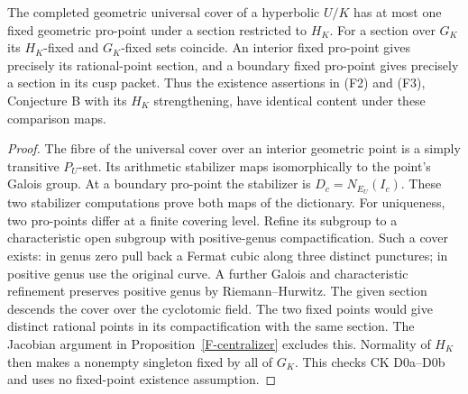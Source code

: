 \begin{proposition}
\label{F-fixed-dictionary}
The completed geometric universal cover of a hyperbolic $U/K$
has at most one fixed geometric pro-point under a section restricted
to $H_K$. For a section over $G_K$ its $H_K$-fixed and $G_K$-fixed
sets coincide. An interior fixed pro-point gives precisely its
rational-point section, and a boundary fixed pro-point gives precisely
a section in its cusp packet. Thus the existence assertions in (F2)
and (F3), Conjecture B with its $H_K$ strengthening, have identical
content under these comparison maps.
\end{proposition}
\begin{proof}
The fibre of the universal cover over an interior geometric point
is a simply transitive $P_U$-set. Its arithmetic stabilizer maps
isomorphically to the point's Galois group. At a boundary pro-point
the stabilizer is $D_c=N_{E_U}(I_c)$. These two stabilizer
computations prove both maps of the dictionary. For uniqueness,
two pro-points differ at a finite covering level. Refine its
subgroup to a characteristic open subgroup with positive-genus
compactification. Such a cover exists: in genus zero pull back a
Fermat cubic along three distinct punctures; in positive genus use
the original curve. A further Galois and characteristic refinement
preserves positive genus by Riemann--Hurwitz. The given section
descends the cover over the cyclotomic field. The two fixed points
would give distinct rational points in its compactification with
the same section. The Jacobian argument in
Proposition~\ref{F-centralizer} excludes this. Normality of $H_K$
then makes a nonempty singleton fixed by all of $G_K$. This checks
CK D0a--D0b and uses no fixed-point existence assumption.
\end{proof}

